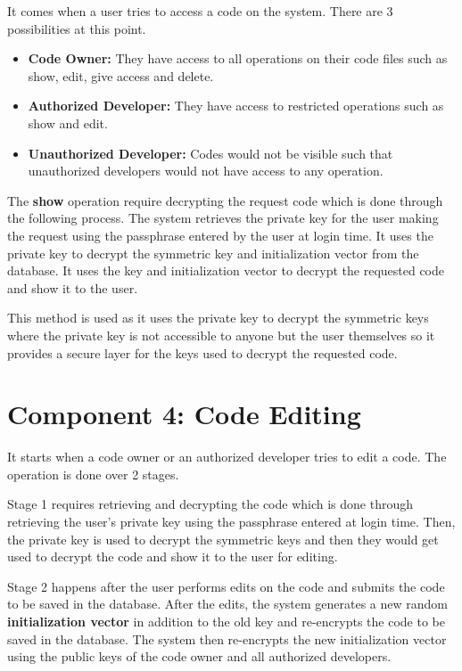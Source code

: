 It comes when a user tries to access a code on the system. There are 3 possibilities at this point.

\begin{itemize}
	\item \textbf{Code Owner:} They have access to all operations on their code files such as show, edit, give access and delete.
	\item \textbf{Authorized Developer:} They have access to restricted operations such as show and edit.
	\item \textbf{Unauthorized Developer:} Codes would not be visible such that unauthorized developers would not have access to any operation.
\end{itemize}

The \textbf{show} operation require decrypting the request code which is done through the following process. The system retrieves the private key for the user making the request using the passphrase entered by the user at login time. It uses the private key to decrypt the symmetric key and initialization vector from the database. It uses the key and initialization vector to decrypt the requested code and show it to the user.

This method is used as it uses the private key to decrypt the symmetric keys where the private key is not accessible to anyone but the user themselves so it provides a secure layer for the keys used to decrypt the requested code.

\section{Component 4: Code Editing}

It starts when a code owner or an authorized developer tries to edit a code. The operation is done over 2 stages.

Stage 1 requires retrieving and decrypting the code which is done through retrieving the user's private key using the passphrase entered at login time. Then, the private key is used to decrypt the symmetric keys and then they would get used to decrypt the code and show it to the user for editing.

Stage 2 happens after the user performs edits on the code and submits the code to be saved in the database. After the edits, the system generates a new random \textbf{initialization vector} in addition to the old key and re-encrypts the code to be saved in the database. The system then re-encrypts the new initialization vector using the public keys of the code owner and all authorized developers.

